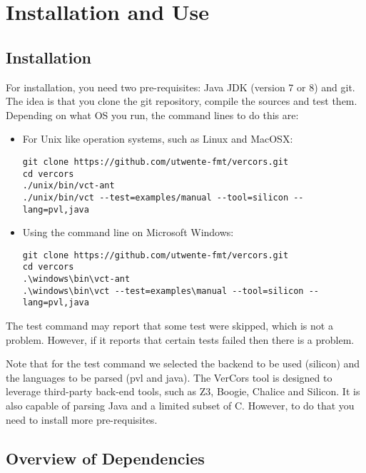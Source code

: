 \chapter{Installation and Use}


\section{Installation}

For installation, you need two pre-requisites: Java JDK (version 7 or 8) and git.
The idea is that you clone the git repository, compile the sources and test them.
Depending on what OS you run, the command lines to do this are:
\begin{itemize}
\item For Unix like operation systems, such as Linux and MacOSX:
\begin{verbatim}
git clone https://github.com/utwente-fmt/vercors.git
cd vercors
./unix/bin/vct-ant
./unix/bin/vct --test=examples/manual --tool=silicon --lang=pvl,java
\end{verbatim}
\item Using the command line on Microsoft Windows:
\begin{verbatim}
git clone https://github.com/utwente-fmt/vercors.git
cd vercors
.\windows\bin\vct-ant
.\windows\bin\vct --test=examples\manual --tool=silicon --lang=pvl,java
\end{verbatim}
\end{itemize}

The test command may report that some test were skipped, which is not a problem.
However, if it reports that certain tests failed then there is a problem.

Note that for the test command we selected the backend to be used (silicon) and the languages to be parsed (pvl and java).
The VerCors tool is designed to leverage third-party back-end tools, such as Z3,
Boogie, Chalice and Silicon. It is also capable of parsing Java and a limited
subset of C. However, to do that you need to install more pre-requisites.

\section{Overview of Dependencies}

